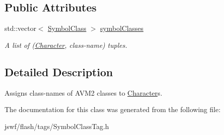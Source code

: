 \subsection*{Public Attributes}
\begin{DoxyCompactItemize}
\item 
\hypertarget{classjswf_1_1flash_1_1tags_1_1_symbol_class_tag_a16b96e51acbb0fa81127b4dd92cc244d}{std\+::vector$<$ \hyperlink{structjswf_1_1flash_1_1_symbol_class}{Symbol\+Class} $>$ \hyperlink{classjswf_1_1flash_1_1tags_1_1_symbol_class_tag_a16b96e51acbb0fa81127b4dd92cc244d}{symbol\+Classes}}\label{classjswf_1_1flash_1_1tags_1_1_symbol_class_tag_a16b96e51acbb0fa81127b4dd92cc244d}

\begin{DoxyCompactList}\small\item\em A list of ({\ttfamily \hyperlink{classjswf_1_1flash_1_1_character}{Character}}, class-\/name) tuples. \end{DoxyCompactList}\end{DoxyCompactItemize}


\subsection{Detailed Description}
Assigns class-\/names of A\+V\+M2 classes to {\ttfamily \hyperlink{classjswf_1_1flash_1_1_character}{Character}}s. 

The documentation for this class was generated from the following file\+:\begin{DoxyCompactItemize}
\item 
jswf/flash/tags/Symbol\+Class\+Tag.\+h\end{DoxyCompactItemize}
